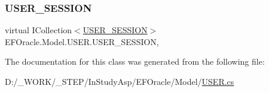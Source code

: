 \mbox{\label{class_e_f_oracle_1_1_model_1_1_u_s_e_r_aaffe4688e7551402b754435df6369ffe}} 
\subsubsection{\texorpdfstring{U\+S\+E\+R\+\_\+\+S\+E\+S\+S\+I\+ON}{USER\_SESSION}}
{\footnotesize\ttfamily virtual I\+Collection$<$\hyperlink{class_e_f_oracle_1_1_model_1_1_u_s_e_r___s_e_s_s_i_o_n}{U\+S\+E\+R\+\_\+\+S\+E\+S\+S\+I\+ON}$>$ E\+F\+Oracle.\+Model.\+U\+S\+E\+R.\+U\+S\+E\+R\+\_\+\+S\+E\+S\+S\+I\+ON\hspace{0.3cm}{\ttfamily [get]}, {\ttfamily [set]}}



The documentation for this class was generated from the following file\+:\begin{DoxyCompactItemize}
\item 
D\+:/\+\_\+\+W\+O\+R\+K/\+\_\+\+S\+T\+E\+P/\+In\+Study\+Asp/\+E\+F\+Oracle/\+Model/\hyperlink{_u_s_e_r_8cs}{U\+S\+E\+R.\+cs}\end{DoxyCompactItemize}
